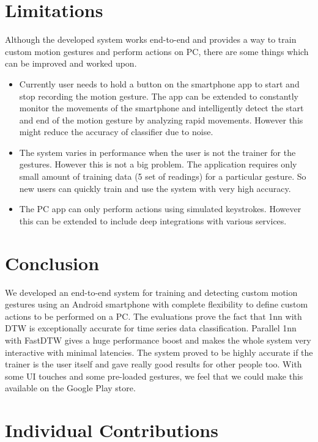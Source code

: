 \documentclass{sigchi}
\begin{document}
 

\section{Limitations}

Although the developed system works end-to-end and provides a way to train custom motion gestures and perform actions on PC, there are some things which can be improved and worked upon.

\begin{itemize}
\item Currently user needs to hold a button on the smartphone app to start and stop recording the motion gesture. The app can be extended to constantly monitor the movements of the smartphone and intelligently detect the start and end of the motion gesture by analyzing rapid movements. However this might reduce the accuracy of classifier due to noise.
\item The system varies in performance when the user is not the trainer for the gestures. However this is not a big problem. The application requires only small amount of training data (5 set of readings) for a particular gesture. So new users can quickly train and use the system with very high accuracy.
\item The PC app can only perform actions using simulated keystrokes. However this can be extended to include deep integrations with various services.
\end{itemize}

\section{Conclusion}

We developed an end-to-end system for training and detecting custom motion gestures using an Android smartphone with complete flexibility to define custom actions to be performed on a PC. The evaluations prove the fact that 1nn with DTW is exceptionally accurate for time series data classification. Parallel 1nn with FastDTW gives a huge performance boost and makes the whole system very interactive with minimal latencies. The system proved to be highly accurate if the trainer is the user itself and gave really good results for other people too. With some UI touches and some pre-loaded gestures, we feel that we could make this available on the Google Play store.

\section{Individual Contributions}
\end{document}
